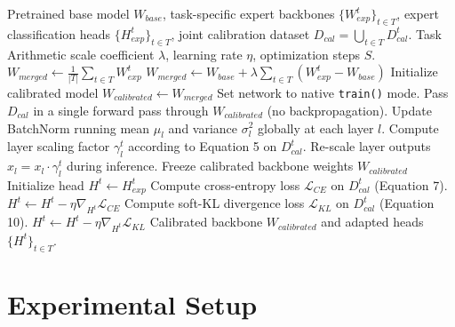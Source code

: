 \documentclass{article}
\theoremstyle{plain}
\theoremstyle{definition}
\theoremstyle{remark}
\begin{document}
\begin{algorithm}[H]
\caption{Synergistic Activation Calibration and Head Adaptation}
\label{alg:synergistic_merging}
\begin{algorithmic}[1]
 Pretrained base model $W_{base}$, task-specific expert backbones $\{W_{exp}^t\}_{t \in T}$, expert classification heads $\{H_{exp}^t\}_{t \in T}$, joint calibration dataset $D_{cal} = \bigcup_{t \in T} D_{cal}^t$.
 Task Arithmetic scale coefficient $\lambda$, learning rate $\eta$, optimization steps $S$.
    \STATE $W_{merged} \leftarrow \frac{1}{|T|} \sum_{t \in T} W_{exp}^t$
    \STATE $W_{merged} \leftarrow W_{base} + \lambda \sum_{t \in T} (W_{exp}^t - W_{base})$
\ENDIF
{}
\STATE Initialize calibrated model $W_{calibrated} \leftarrow W_{merged}$
    \STATE Set network to native \texttt{train()} mode.
    \STATE Pass $D_{cal}$ in a single forward pass through $W_{calibrated}$ (no backpropagation).
    \STATE Update BatchNorm running mean $\mu_l$ and variance $\sigma_l^2$ globally at each layer $l$.
        \STATE Compute layer scaling factor $\gamma_l^t$ according to Equation 5 on $D_{cal}^t$.
        \STATE Re-scale layer outputs $\hat{x}_l = x_l \cdot \gamma_l^t$ during inference.
    \ENDFOR
\ENDIF
{}
\STATE Freeze calibrated backbone weights $W_{calibrated}$
    \STATE Initialize head $H^t \leftarrow H_{exp}^t$
            \STATE Compute cross-entropy loss $\mathcal{L}_{CE}$ on $D_{cal}^t$ (Equation 7).
            \STATE $H^t \leftarrow H^t - \eta \nabla_{H^t} \mathcal{L}_{CE}$
            \STATE Compute soft-KL divergence loss $\mathcal{L}_{KL}$ on $D_{cal}^t$ (Equation 10).
            \STATE $H^t \leftarrow H^t - \eta \nabla_{H^t} \mathcal{L}_{KL}$
        \ENDIF
    \ENDFOR
\ENDFOR
{} Calibrated backbone $W_{calibrated}$ and adapted heads $\{H^t\}_{t \in T}$.
\end{algorithmic}
\end{algorithm}

\section{Experimental Setup}
\label{sec:experimental_setup}
\end{document}
